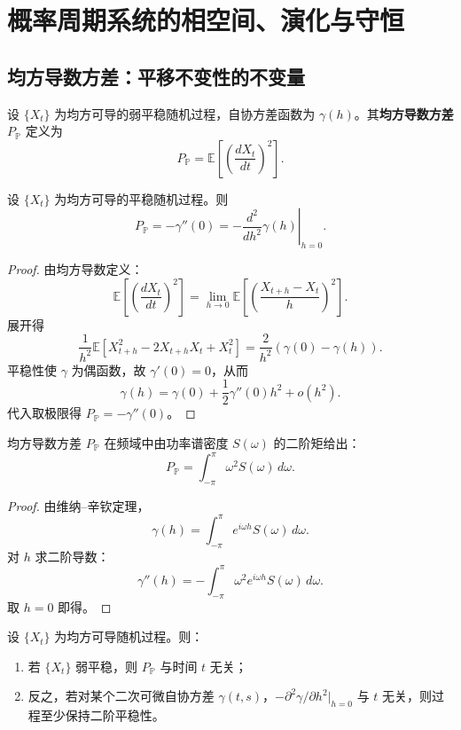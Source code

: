 \section{概率周期系统的相空间、演化与守恒}
\label{sec:prob_phase_space}

\subsection{均方导数方差：平移不变性的不变量}

\begin{definition}[均方导数方差]\label{def:probability_momentum}
设 $\{X_t\}$ 为均方可导的弱平稳随机过程，自协方差函数为 $\gamma(h)$。其\textbf{均方导数方差} $P_{\mathbb P}$ 定义为
\[
P_{\mathbb P}=\mathbb E\left[\left(\frac{dX_t}{dt}\right)^2\right].
\]
\end{definition}

\begin{proposition}[均方导数方差与自相关函数的关系]\label{prop:momentum_autocorrelation}
设 $\{X_t\}$ 为均方可导的平稳随机过程。则
\[
P_{\mathbb P}=-\gamma''(0)=-\left.\frac{d^2}{dh^2}\gamma(h)\right|_{h=0}.
\]
\end{proposition}

\begin{proof}
由均方导数定义：
\[
\mathbb E\left[\left(\frac{dX_t}{dt}\right)^2\right]
=\lim_{h\to0}\mathbb E\left[\left(\frac{X_{t+h}-X_t}{h}\right)^2\right].
\]
展开得
\[
\frac1{h^2}\mathbb E[X_{t+h}^2-2X_{t+h}X_t+X_t^2]
=\frac{2}{h^2}(\gamma(0)-\gamma(h)).
\]
平稳性使 $\gamma$ 为偶函数，故 $\gamma'(0)=0$，从而
\[
\gamma(h)=\gamma(0)+\frac12\gamma''(0)h^2+o(h^2).
\]
代入取极限得 $P_{\mathbb P}=-\gamma''(0)$。
\end{proof}

\begin{proposition}[均方导数方差的频域表示]\label{prop:momentum_frequency}
均方导数方差 $P_{\mathbb P}$ 在频域中由功率谱密度 $S(\omega)$ 的二阶矩给出：
\[
P_{\mathbb P}=\int_{-\pi}^{\pi}\omega^2S(\omega)\,d\omega.
\]
\end{proposition}

\begin{proof}
由维纳--辛钦定理，
\[
\gamma(h)=\int_{-\pi}^{\pi}e^{i\omega h}S(\omega)\,d\omega.
\]
对 $h$ 求二阶导数：
\[
\gamma''(h)=-\int_{-\pi}^{\pi}\omega^2e^{i\omega h}S(\omega)\,d\omega.
\]
取 $h=0$ 即得。
\end{proof}

\begin{proposition}[均方导数方差的不变性与平稳性]\label{prop:momentum_conservation_stationarity}
设 $\{X_t\}$ 为均方可导随机过程。则：
\begin{enumerate}[label=(\roman*)]
    \item 若 $\{X_t\}$ 弱平稳，则 $P_{\mathbb P}$ 与时间 $t$ 无关；
    \item 反之，若对某个二次可微自协方差 $\gamma(t,s)$，$-\partial^2\gamma/\partial h^2|_{h=0}$ 与 $t$ 无关，则过程至少保持二阶平稳性。
\end{enumerate}
\end{proposition}

